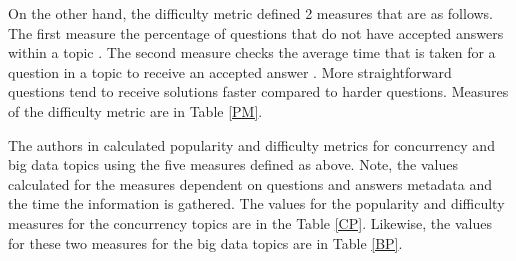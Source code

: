 On the other hand, the difficulty metric defined 2 measures that are as follows. The first measure the percentage of questions that do not have accepted answers within a topic \cite{rosen2016mobile, treude2011programmers,yang2016security}. The second measure checks the average time that is taken for a question in a topic to receive an accepted answer \cite{rosen2016mobile, yang2016security}. More straightforward questions tend to receive solutions faster compared to harder questions. Measures of the difficulty metric are in Table \ref{PM}.

The authors in \cite{ahmed2018concurrency, bagherzadeh2019going} calculated popularity and difficulty metrics for concurrency and big data topics using the five measures defined as above. Note, the values calculated for the measures dependent on questions and answers metadata and the time the information is gathered. The values for the popularity and difficulty measures for the concurrency topics are in the Table \ref{CP}. Likewise, the values for these two measures for the big data topics are in Table \ref{BP}.


